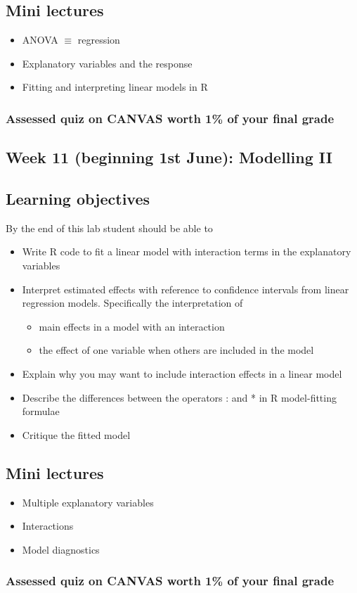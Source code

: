\documentclass{article}
\begin{document}
\subsection*{Mini lectures}

\begin{itemize}
\item ANOVA $\equiv$ regression
\item Explanatory variables and the response
\item Fitting and interpreting linear models in R
\end{itemize}


\subsubsection*{Assessed quiz on CANVAS worth 1\% of your final grade}



\newpage

\subsection*{Week 11 (beginning 1st June): Modelling II}
\subsection*{Learning objectives}
By the end of this lab student should be able to
\begin{itemize}
\item Write R code to fit a linear model with interaction terms in the explanatory variables
\item Interpret estimated effects with reference to confidence intervals from linear regression models. Specifically the interpretation of
  \begin{itemize}
  \item main effects in a model with an interaction
  \item the effect of one variable when others are included in the model
  \end{itemize}
\item Explain why you may want to include interaction effects in a linear model
\item Describe the differences between the operators : and * in R model-fitting formulae
\item Critique the fitted model
\end{itemize}

\subsection*{Mini lectures}

\begin{itemize}
\item Multiple explanatory variables
\item Interactions
\item Model diagnostics
\end{itemize}

\subsubsection*{Assessed quiz on CANVAS worth 1\% of your final grade}
\end{document}
